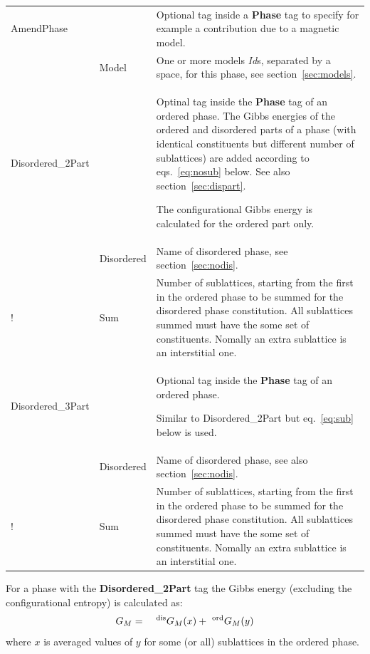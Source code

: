 \documentclass{article}
\begin{document}
\begin{tabular}{|p{} p{} p{}|}
  AmendPhase & & Optional tag inside a {\bf Phase} tag to specify
               for example a contribution due to a magnetic model.\\
        & Model & One or more models {\em Id}s, separated by a space, for 
             this phase, see section~\ref{sec:models}.\\\hline

  Disordered\_2Part & & Optinal tag inside the {\bf Phase} tag of an 
              ordered phase.
              The Gibbs energies of the ordered and disordered parts
              of a phase (with identical constituents but different
              number of sublattices) are added according to
              eqs.~\ref{eq:nosub} below.  See also section~\ref{sec:dispart}.

              The configurational Gibbs energy is calculated for
              the ordered part only.  \\

   & Disordered & Name of disordered phase, see section~\ref{sec:nodis}.\\

!  & Sum & Number of sublattices, starting from the first in the
              ordered phase to be summed for the disordered phase
              constitution.  All sublattices summed must have the some
              set of constituents.  Nomally an extra sublattice is an
              interstitial one.\\\hline

   Disordered\_3Part & & Optional tag inside the {\bf Phase} tag of an
              ordered phase.

              Similar to Disordered\_2Part but eq.~\ref{eq:sub} below is used.\\

        & Disordered & Name of disordered phase, see also section~\ref{sec:nodis}.\\

!  & Sum & Number of sublattices, starting from the first in the
              ordered phase to be summed for the disordered phase
              constitution.  All sublattices summed must have the some
              set of constituents.  Nomally an extra sublattice is an
              interstitial one.\\\hline

\end{tabular}

\bigskip
For a phase with the {\bf Disordered\_2Part} tag the Gibbs energy
(excluding the configurational entropy) is calculated as:
\begin{eqnarray}
G_M &=& ~^{\rm dis}G_M(x) + ~^{\rm ord}G_M(y) \label{eq:nosub}
\end{eqnarray}
where $x$ is averaged values of $y$ for some (or all) sublattices in the
ordered phase.
\end{document}
